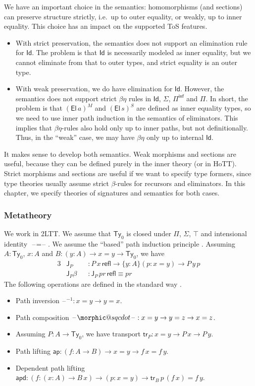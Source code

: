 \documentclass[12pt,a4paper,twoside,openany]{book}
\makeatletter
\DeclareRobustCommand{\sqcdot}{\mathbin{\mathpalette\morphic@sqcdot\relax}}
\newcommand{\morphic@sqcdot}[2]{%
  \sbox\z@{$\m@th#1\centerdot$}%
  \ht\z@=.33333\ht\z@
  \vcenter{\box\z@}%
}
\theoremstyle{remark}
\theoremstyle{definition}
\theoremstyle{theorem}
\newcommand{\mi}[1]{\mathit{#1}}
\newcommand{\ms}[1]{\mathsf{#1}}
\newcommand{\ap}{\ms{ap}}
\newcommand{\apd}{\ms{apd}}
\newcommand{\tr}{\ms{tr}}
\newcommand{\J}{\ms{J}}
\newcommand{\refl}{\mathsf{refl}}
\newcommand{\Ty}{\mathsf{Ty}}
\newcommand{\El}{\mathsf{El}}
\newcommand{\Id}{\mathsf{Id}}
\newcommand{\blank}{\mathord{\hspace{1pt}\text{--}\hspace{1pt}}}
\newcommand{\Piinf}{\Pi^{\mathsf{inf}}}
\makeatother
\begin{document}
We have an important choice in the semantics: homomorphisms (and sections) can
preserve structure strictly, i.e.\ up to outer equality, or weakly, up to inner
equality. This choice has an impact on the supported ToS features.
\begin{itemize}
\item
  With strict preservation, the semantics does not support an elimination
  rule for $\Id$. The problem is that $\Id$ is necessarily modeled as inner
  equality, but we cannot eliminate from that to outer types, and strict
  equality is an outer type.
\item
  With weak preservation, we do have elimination for $\Id$. However, the
  semantics does not support strict $\beta\eta$ rules in $\Id$, $\Sigma$,
  $\Piinf$ and $\Pi$.  In short, the problem is that $(\El\,a)^M$ and
  $(\El\,s)^S$ are defined as inner equality types, so we need to use inner path
  induction in the semantics of eliminators. This implies that $\beta\eta$-rules
  also hold only up to inner paths, but not definitionally. Thus, in the
  ``weak'' case, we may have $\beta\eta$ only up to internal $\Id$.
\end{itemize}
It makes sense to develop both semantics. Weak morphisms and sections are
useful, because they can be defined purely in the inner theory (or in HoTT). Strict
morphisms and sections are useful if we want to specify type formers, since type
theories usually assume strict $\beta$-rules for recursors and eliminators. In
this chapter, we specify theories of signatures and semantics for both cases.

\subsubsection{Metatheory}

We work in 2LTT. We assume that $\Ty_0$ is closed under $\Pi$, $\Sigma$, $\top$
and intensional identity $\blank\!=\!\blank$. We assume the ``based'' path induction principle
\cite[Section~1.12.1]{hottbook}. Assuming $A : \Ty_0$, $x : A$ and $B : (y : A) \to x = y \to \Ty_0$,
we have
\begin{alignat*}{3}
  & \J_P      &&: P\,x\,\refl \to \{y : A\}(p : x = y) \to P\,y\,p\\
  & \J_P\beta &&: \J_P\,\mi{pr}\,\refl \equiv \mi{pr}
\end{alignat*}
The following operations are defined in the standard way
\cite[Section~2]{hottbook}.
\begin{itemize}
  \item Path inversion $\blank^{-1} : x = y \to y = x$.
  \item Path composition $\blank\!\sqcdot\!\blank : x = y \to y = z \to x = z$.
  \item Assuming $P : A \to \Ty_0$, we have transport $\tr_P : x = y \to P\,x \to P\,y$.
  \item Path lifting $\ap : (f : A \to B) \to x = y \to f\,x = f\,y$.
  \item Dependent path lifting $\apd : (f : (x : A) \to B\,x) \to (p : x = y) \to \tr_B\,p\,(f\,x) = f\,y$.
\end{itemize}
\end{document}
